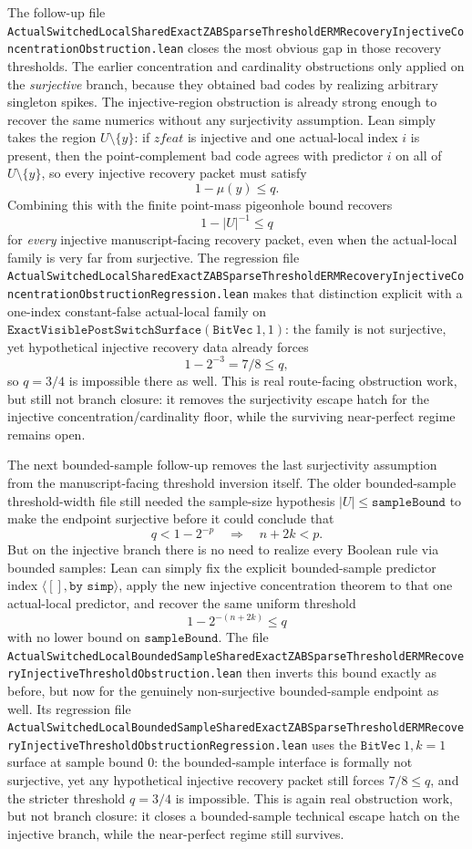 \documentclass[11pt]{article}
\theoremstyle{remark}
\begin{document}
The follow-up file
\texttt{ActualSwitchedLocalSharedExactZABSparseThresholdERMRecoveryInjectiveConcentrationObstruction.lean}
closes the most obvious gap in those recovery thresholds.  The earlier
concentration and cardinality obstructions only applied on the \emph{surjective}
branch, because they obtained bad codes by realizing arbitrary singleton spikes.
The injective-region obstruction is already strong enough to recover the same
numerics without any surjectivity assumption.  Lean simply takes the region
\(U \setminus \{y\}\): if \(zfeat\) is injective and one actual-local index
\(i\) is present, then the point-complement bad code agrees with predictor
\(i\) on all of \(U \setminus \{y\}\), so every injective recovery packet must
satisfy
\[
  1 - \mu(y) \le q.
\]
Combining this with the finite point-mass pigeonhole bound recovers
\[
  1 - |U|^{-1} \le q
\]
for \emph{every} injective manuscript-facing recovery packet, even when the
actual-local family is very far from surjective.  The regression file
\texttt{ActualSwitchedLocalSharedExactZABSparseThresholdERMRecoveryInjectiveConcentrationObstructionRegression.lean}
makes that distinction explicit with a one-index constant-false actual-local
family on \(\texttt{ExactVisiblePostSwitchSurface}(\texttt{BitVec}\ 1,1)\): the
family is not surjective, yet hypothetical injective recovery data already
forces
\[
  1 - 2^{-3} = 7/8 \le q,
\]
so \(q = 3/4\) is impossible there as well.  This is real route-facing
obstruction work, but still not branch closure: it removes the surjectivity
escape hatch for the injective concentration/cardinality floor, while the
surviving near-perfect regime remains open.

The next bounded-sample follow-up removes the last surjectivity assumption from
the manuscript-facing threshold inversion itself.  The older bounded-sample
threshold-width file still needed the sample-size hypothesis
\(|U| \le \texttt{sampleBound}\) to make the endpoint surjective before it
could conclude that
\[
  q < 1 - 2^{-p}
  \quad\Longrightarrow\quad
  n + 2k < p.
\]
But on the injective branch there is no need to realize every Boolean rule via
bounded samples: Lean can simply fix the explicit bounded-sample predictor
index \(\langle [], \texttt{by simp}\rangle\), apply the new injective
concentration theorem to that one actual-local predictor, and recover the same
uniform threshold
\[
  1 - 2^{-(n + 2k)} \le q
\]
with no lower bound on \(\texttt{sampleBound}\).  The file
\texttt{ActualSwitchedLocalBoundedSampleSharedExactZABSparseThresholdERMRecoveryInjectiveThresholdObstruction.lean}
then inverts this bound exactly as before, but now for the genuinely
non-surjective bounded-sample endpoint as well.  Its regression file
\texttt{ActualSwitchedLocalBoundedSampleSharedExactZABSparseThresholdERMRecoveryInjectiveThresholdObstructionRegression.lean}
uses the \(\texttt{BitVec}\ 1, k=1\) surface at sample bound \(0\): the
bounded-sample interface is formally not surjective, yet any hypothetical
injective recovery packet still forces \(7/8 \le q\), and the stricter
threshold \(q = 3/4\) is impossible.  This is again real obstruction work, but
not branch closure: it closes a bounded-sample technical escape hatch on the
injective branch, while the near-perfect regime still survives.
\end{document}
